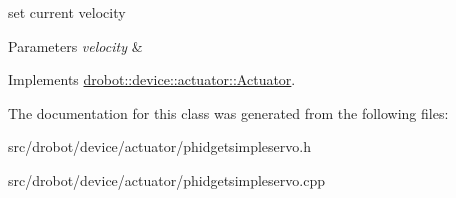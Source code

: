 set current velocity 


\begin{DoxyParams}{Parameters}
{\em velocity} & \\
\hline
\end{DoxyParams}


Implements \hyperlink{classdrobot_1_1device_1_1actuator_1_1Actuator_a452a63a9cf5daf479c12b99c3e99679c}{drobot\-::device\-::actuator\-::\-Actuator}.



The documentation for this class was generated from the following files\-:\begin{DoxyCompactItemize}
\item 
src/drobot/device/actuator/phidgetsimpleservo.\-h\item 
src/drobot/device/actuator/phidgetsimpleservo.\-cpp\end{DoxyCompactItemize}
